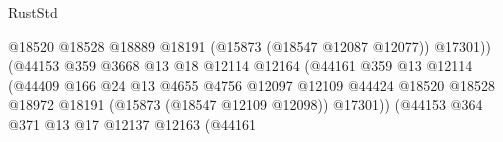 \begin{lexlean}{RustStd}
\begin{coremodule}
                                                          @18520
                                                          @18528
                                                          @18889
                                                          @18191
                                                          (@15873 (@18547 @12087 @12077))
                                                          @17301))
                                                      (@44153
                                                        @359
                                                        @3668
                                                        @13
                                                        @18
                                                        @12114
                                                        @12164
                                                        (@44161
                                                          @359
                                                          @13
                                                          @12114
                                                          (@44409
                                                            @166
                                                            @24
                                                            @13
                                                            @4655
                                                            @4756
                                                            @12097
                                                            @12109
                                                            @44424
                                                            @18520
                                                            @18528
                                                            @18972
                                                            @18191
                                                            (@15873 (@18547 @12109 @12098))
                                                            @17301))
                                                        (@44153
                                                          @364
                                                          @371
                                                          @13
                                                          @17
                                                          @12137
                                                          @12163
                                                          (@44161

\end{coremodule}
\end{lexlean}
